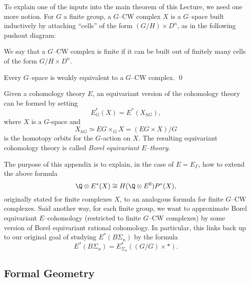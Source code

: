 To explain one of the inputs into the main theorem of this Lecture, we need one more notion. For \(G\) a finite group, a \(G\)--CW complex \(X\) is a \(G\)--space built inductively by attaching ``cells'' of the form \((G/H) \times D^n\), as in the following pushout diagram:
\begin{center}
\end{center}
We say that a \(G\)--CW complex is finite if it can be built out of finitely many cells of the form \(G/H \times D^n\).

\begin{theorem} \label{app:CWapprox}
Every \(G\)--space is weakly equivalent to a \(G\)--CW complex. \qed
\end{theorem}

Given a cohomology theory \(E\), an equivariant version of the cohomology theory can be formed by setting
\[
E^{*}_{G}(X) = E^*(X_{hG}),
\]
where \(X\) is a \(G\)-space and
\[
X_{hG} \simeq EG \times_G X = (EG \times X)/G
\]
is the homotopy orbits for the \(G\)-action on \(X\). The resulting equivariant cohomology theory is called \textit{Borel equivariant \(E\)--theory}.

The purpose of this appendix is to explain, in the case of \(E = E_{\Gamma}\), how to extend the above formula \[\Q \otimes E^*(X) \cong H(\Q \otimes E^0)P^*(X),\] originally stated for finite complexes \(X\), to an analogous formula for finite \(G\)--CW complexes. Said another way, for each finite group, we want to approximate Borel equivariant \(E\)--cohomology (restricted to finite \(G\)--CW complexes) by some version of Borel equivariant rational cohomology.  In particular, this links back up to our original goal of studying \(E^*(B\Sigma_n)\) by the formula \[E^*(B\Sigma_n) = E_{\Sigma_n}^*((G/G) \times *).\]

\subsection*{Formal Geometry}


